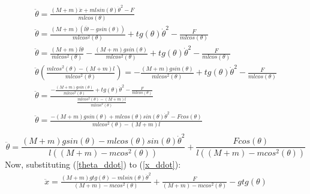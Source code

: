 \documentclass[a4paper,12pt]{article}
\begin{document}
    \begin{gather*}
        \ddot{\theta}=
        \frac
        {(M+m)\ddot{x}+mlsin(\theta)\dot \theta^2-F}
        {mlcos(\theta)}
        \\
        \ddot{\theta}=
        \frac
        {(M+m) (l\ddot \theta - gsin(\theta))}
        {mlcos^2(\theta)}
        +
        tg(\theta) \dot \theta^2
        - 
        \frac
        {F}
        {mlcos(\theta)}
        \\
        \ddot{\theta}=
        \frac
        {(M+m)l\ddot\theta}
        {mlcos^2(\theta)}
        - 
        \frac
        {(M+m)gsin(\theta)}
        {mlcos^2(\theta)}
        +
        tg(\theta) \dot \theta^2
        - 
        \frac
        {F}
        {mlcos(\theta)}
        \\
        \ddot{\theta}
        \left(
            \frac
            {mlcos^2(\theta)-(M+m)l}
            {mlcos^2(\theta)}
        \right)=
        - 
        \frac
        {(M+m)gsin(\theta)}
        {mlcos^2(\theta)}
        +
        tg(\theta)\dot \theta^2 
        -
        \frac
        {F}
        {mlcos(\theta)}
        \\
        \ddot\theta =
        \frac
        {-  \frac
            {(M+m)gsin(\theta)}
            {mlcos^2(\theta)}
            +
            tg(\theta)\dot \theta^2
            - 
            \frac
            {F}
            {mlcos(\theta)}
        }
        {
            \frac
            {mlcos^2(\theta)-(M+m)l}
            {mlcos^2(\theta)}
        }
        \\
        \ddot\theta = 
        \frac
        {-(M+m)gsin(\theta) + mlcos(\theta)sin(\theta)\dot\theta^2 - Fcos(\theta)}
        {mlcos^2(\theta)-(M+m)l}
        \\
    \end{gather*}
    \begin{equation}\label{theta_ddot}
        \ddot\theta = 
        \frac
        {(M+m)gsin(\theta) - mlcos(\theta)sin(\theta)\dot \theta^2}
        {l((M+m) - mcos^2(\theta))}
        +
        \frac
        {Fcos(\theta)}
        {l((M+m) - mcos^2(\theta))}
    \end{equation}
    Now, substituting (\ref{theta_ddot}) to (\ref{x_ddot}):
    \begin{gather*}
        \ddot x = 
        \frac
        {(M+m)gtg(\theta) - mlsin(\theta)\dot \theta^2}
        {(M+m) - mcos^2(\theta)}
        +
        \frac
        {F}
        {(M+m) - mcos^2(\theta)}
        -
        gtg(\theta)
    \end{gather*}
\end{document}
